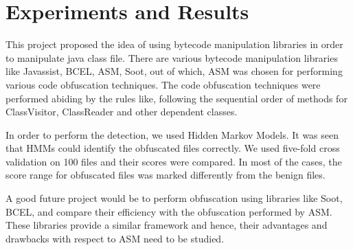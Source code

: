 \chapter{Experiments and Results}

This project proposed the idea of using bytecode manipulation libraries in order to manipulate java class file. There are various bytecode manipulation libraries like Javassist, BCEL, ASM, Soot, out of which, ASM was chosen for performing various code obfuscation techniques. The code obfuscation techniques were performed abiding by the rules like, following the sequential order of methods for ClassVisitor, ClassReader and other dependent classes. 

In order to perform the detection, we used Hidden Markov Models. It was seen that HMMs could identify the obfuscated files correctly. We used five-fold cross validation on 100 files and their scores were compared. In most of the cases, the score range for obfuscated files was marked differently from the benign files.

A good future project would be to perform obfuscation using libraries like Soot, BCEL, and compare their efficiency with the obfuscation performed by ASM. These libraries provide a similar framework and hence, their advantages and drawbacks with respect to ASM need to be studied.
